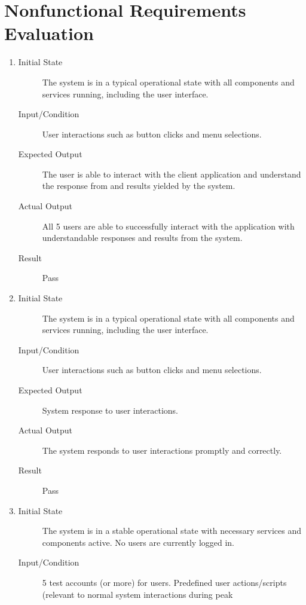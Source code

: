 \documentclass[12pt, titlepage]{article}
\begin{document}
\section{Nonfunctional Requirements Evaluation}

\begin{enumerate}[NFR-T1]
  \item \label{NFRT1}
    \begin{description}
    \item[Initial State] The system is in a typical operational state with all
      components and services running, including the user interface.
    \item[Input/Condition] User interactions such as button clicks and menu
      selections.
    \item[Expected Output] The user is able to interact with the client application
      and understand the response from and results yielded by the system.
    \item[Actual Output] All 5 users are able to successfully interact with the
      application with understandable responses and results from the system.
    \item[Result] Pass
    \end{description}
  \item \label{NFRT2}
    \begin{description}
    \item[Initial State] The system is in a typical operational state with all
      components and services running, including the user interface.
    \item[Input/Condition] User interactions such as button clicks and menu
      selections.
    \item[Expected Output] System response to user interactions.
    \item[Actual Output] The system responds to user interactions promptly and
      correctly.
    \item[Result] Pass
    \end{description}
  \item \label{NFRT3}
    \begin{description}
    \item[Initial State] The system is in a stable operational state with necessary
      services and components active. No users are currently logged in.
    \item[Input/Condition] 5 test accounts (or more) for users. Predefined user
      actions/scripts (relevant to normal system interactions during peak

\end{description}
\end{enumerate}
\end{document}
